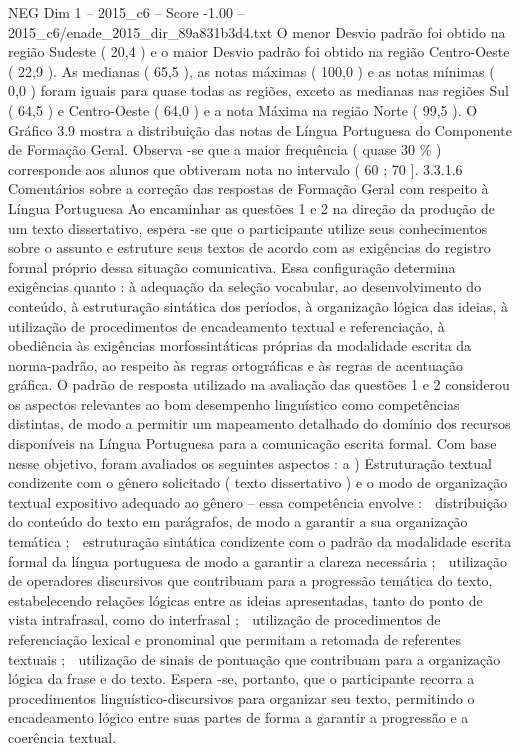 \begin{textsample}{NEG Dim 1 – 2015\_c6 – Score -1.00 – 2015\_c6/enade\_2015\_dir\_89a831b3d4.txt}
O menor Desvio padrão foi obtido na região Sudeste ( 20,4 ) e o maior Desvio padrão foi obtido na região Centro-Oeste ( 22,9 ).
As medianas ( 65,5 ), as notas máximas ( 100,0 ) e as notas mínimas ( 0,0 ) foram iguais para quase todas as regiões, exceto as medianas nas regiões Sul ( 64,5 ) e Centro-Oeste ( 64,0 ) e a nota Máxima na região Norte ( 99,5 ).
O Gráfico 3.9 mostra a distribuição das notas de Língua Portuguesa do Componente de Formação Geral.
Observa -se que a maior frequência ( quase 30 \% ) corresponde aos alunos que obtiveram nota no intervalo ( 60 ; 70 ]. 3.3.1.6 Comentários sobre a correção das respostas de Formação Geral com respeito à Língua Portuguesa Ao encaminhar as questões 1 e 2 na direção da produção de um texto dissertativo, espera -se que o participante utilize seus conhecimentos sobre o assunto e estruture seus textos de acordo com as exigências do registro formal próprio dessa situação comunicativa.
Essa configuração determina exigências quanto : à adequação da seleção vocabular, ao desenvolvimento do conteúdo, à estruturação sintática dos períodos, à organização lógica das ideias, à utilização de procedimentos de encadeamento textual e referenciação, à obediência às exigências morfossintáticas próprias da modalidade escrita da norma-padrão, ao respeito às regras ortográficas e às regras de acentuação gráfica.
O padrão de resposta utilizado na avaliação das questões 1 e 2 considerou os aspectos relevantes ao bom desempenho linguístico como competências distintas, de modo a permitir um mapeamento detalhado do domínio dos recursos disponíveis na Língua Portuguesa para a comunicação escrita formal.
Com base nesse objetivo, foram avaliados os seguintes aspectos : a ) Estruturação textual condizente com o gênero solicitado ( texto dissertativo ) e o modo de organização textual expositivo adequado ao gênero – essa competência envolve :  distribuição do conteúdo do texto em parágrafos, de modo a garantir a sua organização temática ;  estruturação sintática condizente com o padrão da modalidade escrita formal da língua portuguesa de modo a garantir a clareza necessária ;  utilização de operadores discursivos que contribuam para a progressão temática do texto, estabelecendo relações lógicas entre as ideias apresentadas, tanto do ponto de vista intrafrasal, como do interfrasal ;  utilização de procedimentos de referenciação lexical e pronominal que permitam a retomada de referentes textuais ;  utilização de sinais de pontuação que contribuam para a organização lógica da frase e do texto.
Espera -se, portanto, que o participante recorra a procedimentos linguístico-discursivos para organizar seu texto, permitindo o encadeamento lógico entre suas partes de forma a garantir a progressão e a coerência textual.

\end{textsample}
